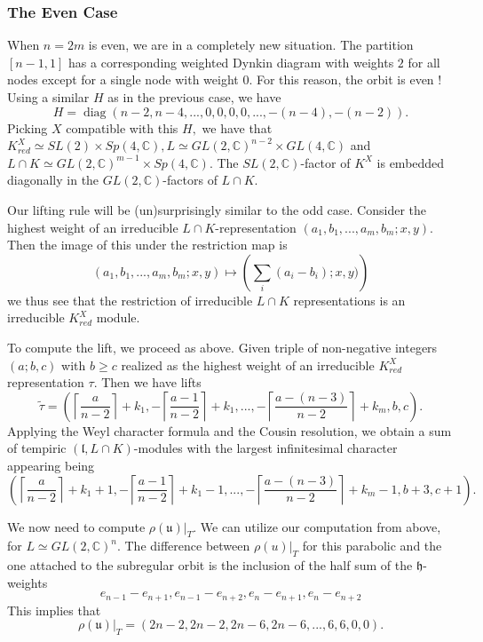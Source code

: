 \documentclass[letterpaper,twosided,11pt]{article}
\theoremstyle{plain}
\theoremstyle{definition}
\theoremstyle{remark}
\newcommand{\C}{\mathbb{C}}
\newcommand{\lie}[1]{\mathfrak{#1}}
\begin{document}
\subsubsection{The Even Case}

When $n=2m$ is even, we are in a completely new situation. The partition $[n-1,1]$ has
 a corresponding weighted Dynkin diagram with weights $2$ for all nodes except for
  a single node with weight $0.$ For this reason, the orbit is even \cite{Collingwood1993}!
   Using a similar $H$ as in the previous case, we have
    \[ H=\operatorname{diag}(n-2,n-4,...,0,0,0,0,...,-(n-4),-(n-2)).\]
Picking $X$ compatible with this $H,$ we have 
that $K^X_{red}\simeq SL(2)\times Sp(4,\C), L\simeq GL(2,\C)^{n-2}\times GL(4,\C)$
 and $L\cap K\simeq GL(2,\C)^{m-1}\times Sp(4,\C).$ The $SL(2,\C)$-factor of $K^X$
  is embedded diagonally in the $GL(2,\C)$-factors of $L\cap K.$   
 
 Our lifting rule will be (un)surprisingly similar to the odd case. Consider
  the highest weight of an irreducible $L\cap K$-representation $(a_1,b_1,...,a_{m},b_m; x,y).$ 
  Then the image of this under the restriction map is
   \[  (a_1,b_1,...,a_{m},b_m; x,y)\mapsto \left(\sum_i (a_i-b_i); x,y)\right) \] we thus
    see that the restriction of irreducible $L\cap K$  representations is an irreducible $K^X_{red}$ 
    module.    
   
   To compute the lift, we proceed as above. Given triple of non-negative
    integers $(a;b,c)$ with $b\geq c$ realized as the highest weight of
    an irreducible $K^X_{red}$ representation $\tau$. Then we have  lifts 
    \[ \widetilde{\tau}=\left( \left\lceil \frac{a}{n-2} \right \rceil+k_1, -\left\lceil \frac{a-1}
    {n-2} \right \rceil+k_1 ,...,-\left\lceil \frac{a-(n-3)}{n-2} \right \rceil +k_{m}, b,c \right).\]
Applying the Weyl character formula and the Cousin resolution, 
we obtain a sum of tempiric $(\lie{l},L\cap K)$-modules with the largest 
infinitesimal character appearing being \[ \left( \left\lceil \frac{a}{n-2} \right \rceil+k_1+1, -\left\lceil \frac{a-1}
    {n-2} \right \rceil+k_1-1 ,...,-\left\lceil \frac{a-(n-3)}{n-2} \right \rceil +k_{m}-1, b+3,c+1 \right).\]

We now need to compute $\rho(\lie{u})|_T.$ We can utilize our computation
 from above, for $L\simeq GL(2,\C)^n.$ The difference between $\rho(u)|_T$ for this parabolic
 and the one attached to the subregular orbit is the inclusion of the half sum of the $\lie{h}$-weights 
 \[e_{n-1}-e_{n+1},e_{n-1}-e_{n+2}, e_n-e_{n+1},e_{n}-e_{n+2}\]
 This implies that \[ \rho(\lie{u})|_T=(2n-2,2n-2,2n-6,2n-6,...,6,6,0,0).\]
 
\end{document}
